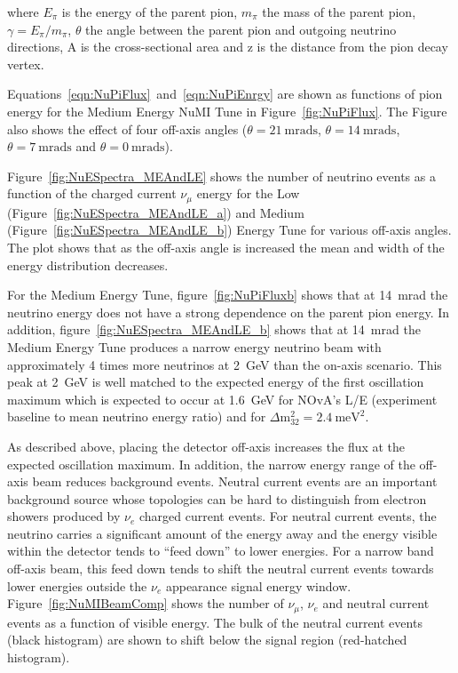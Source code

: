\noindent where $E_{\pi}$ is the energy of the parent pion, $m_{\pi}$
the mass of the parent pion, $\gamma = E_{\pi}/m_{\pi}$, $\theta$ the
angle between the parent pion and outgoing
neutrino directions, A is the cross-sectional area and z is the distance
from the pion decay vertex.


Equations~\ref{eqn:NuPiFlux}~and~\ref{eqn:NuPiEnrgy} are shown as 
functions of pion energy for the Medium Energy NuMI Tune in
Figure~\ref{fig:NuPiFlux}. The Figure also shows the effect of four
off-axis angles ($\theta = 21~\text{mrads}$, $\theta =
14~\text{mrads}$, $\theta = 7~\text{mrads}$ and $\theta =
0~\text{mrads}$). 


Figure~\ref{fig:NuESpectra_MEAndLE} shows the number of neutrino
events as a function of the
charged current $\nu_{\mu}$ energy for the Low
(Figure~\ref{fig:NuESpectra_MEAndLE_a}) and 
Medium (Figure~\ref{fig:NuESpectra_MEAndLE_b}) Energy Tune for various
off-axis angles. The plot shows that as the off-axis angle is
increased the mean and width of the energy distribution decreases.


For the Medium Energy Tune, figure~\ref{fig:NuPiFluxb} shows that at
14~mrad the neutrino energy
does not have a strong dependence on the parent pion energy.
In addition, figure~\ref{fig:NuESpectra_MEAndLE_b} shows that at
14~mrad the Medium
Energy Tune produces a narrow energy neutrino beam with approximately
4 times more neutrinos at 2~GeV than the on-axis scenario. This peak at
2~GeV is well matched to the expected energy of the first oscillation
maximum which is expected to occur at 1.6~GeV for
NOvA's L/E (experiment baseline to mean neutrino energy ratio) and for
$\Delta \textrm{m}_{32}^2=2.4~\textrm{meV}^2$. 

As described above, placing the detector off-axis increases the flux
at the expected oscillation maximum. In addition, the narrow energy
range of the off-axis beam reduces background
events. Neutral current events are an important background source
whose topologies can be hard to distinguish from electron showers
produced by $\nu_e$ charged current events. For neutral current events, the neutrino carries a
significant amount of the energy away and the energy visible within
the detector tends to
``feed down'' to lower energies. For a narrow band off-axis beam, this
feed down tends to shift the neutral current events towards lower energies
outside the $\nu_e$ appearance signal energy
window. Figure~\ref{fig:NuMIBeamComp} 
shows the number of $\nu_{\mu}$, $\nu_e$ and neutral current events as a function
of visible energy. The bulk of the neutral current events (black histogram) are
shown to shift below the signal region (red-hatched histogram).


